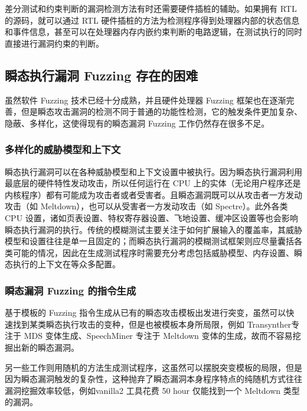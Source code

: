 差分测试和约束判断的漏洞检测方法有时还需要硬件插桩的辅助。如果拥有 RTL 的源码，就可以通过 RTL 硬件插桩的方法为检测程序得到处理器内部的状态信息和事件信息，甚至可以在处理器内存内嵌约束判断的电路逻辑，在测试执行的同时直接进行漏洞约束的判断。

\subsection{瞬态执行漏洞 Fuzzing 存在的困难}

虽然软件 Fuzzing 技术已经十分成熟，并且硬件处理器 Fuzzing 框架也在逐渐完善，但是瞬态攻击漏洞的检测不同于普通的功能性检测，它的触发条件更加复杂、隐蔽、多样化，这使得现有的瞬态漏洞 Fuzzing 工作仍然存在很多不足。

\subsubsection{多样化的威胁模型和上下文}

瞬态执行漏洞可以在各种威胁模型和上下文设置\cite{kocher2020spectre}\cite{horn2018meltdown}\cite{ragab2021rage}\cite{van2006cacheout}中被执行。因为瞬态执行漏洞利用最底层的硬件特性发动攻击，所以任何运行在 CPU 上的实体（无论用户程序还是内核程序）都有可能成为攻击者或者受害者。且瞬态漏洞既可以从攻击者一方发动攻击（如 Meltdown），也可以从受害者一方发动攻击（如 Spectre）。此外各类 CPU 设置，诸如页表设置\cite{horn2018meltdown}、特权寄存器设置、飞地设置\cite{van2018foreshadow}、缓冲区设置\cite{moghimi2020medusa}等也会影响瞬态执行漏洞的执行。传统的模糊测试主要关注于如何扩展输入的覆盖率，其威胁模型和设置往往是单一且固定的；而瞬态执行漏洞的模糊测试框架则应尽量囊括各类可能的情况，因此在生成测试程序时需要充分考虑包括威胁模型、内存设置、瞬态执行的上下文在等众多配置。

\subsubsection{瞬态漏洞 Fuzzing 的指令生成}

基于模板的 Fuzzing 指令生成从已有的瞬态攻击模板出发进行突变，虽然可以快速找到某类瞬态执行攻击的变种，但是也被模板本身所局限，例如 Transynther\cite{moghimi2020medusa}专注于 MDS 变体生成、SpeechMiner \cite{xiao2019speechminer}专注于 Meltdown 变体的生成，故而不容易挖掘出新的瞬态漏洞。\par
另一些工作\cite{oleksenko2022revizor}则用随机的方法生成测试程序，这虽然可以摆脱突变模板的局限，但是因为瞬态漏洞触发的复杂性，这种抛弃了瞬态漏洞本身程序特点的纯随机方式往往漏洞挖掘效率较低，例如vanilla2 工具花费 50 hour 仅能找到一个 Meltdown 类型的漏洞\cite{hur2022specdoctor}。

